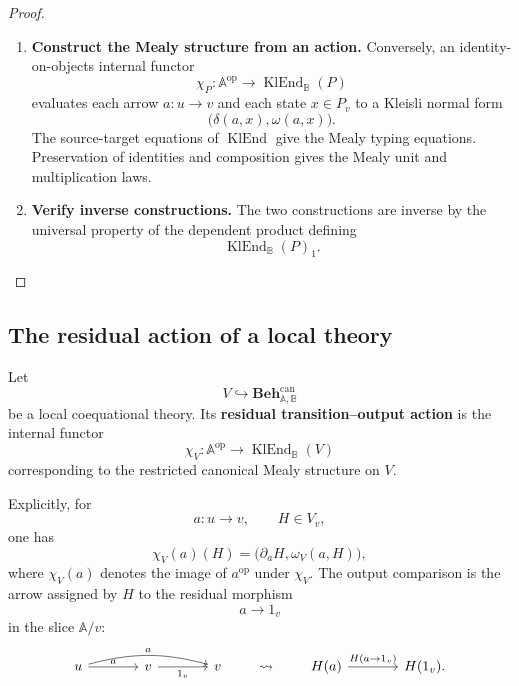 \begin{proof}
\begin{enumerate}
        \item \textbf{Construct the Mealy structure from an action.}
        Conversely, an identity-on-objects internal functor
        \[
            \chi_P:\mathbb A^{\mathrm{op}}
            \to
            \operatorname{KlEnd}_{\mathbb B}(P)
        \]
        evaluates each arrow \(a:u\to v\) and each state \(x\in P_v\) to a
        Kleisli normal form
        \[
            \bigl(\delta(a,x),\omega(a,x)\bigr).
        \]
        The source-target equations of \(\operatorname{KlEnd}\) give the
        Mealy typing equations. Preservation of identities and composition
        gives the Mealy unit and multiplication laws.

        \item \textbf{Verify inverse constructions.}
        The two constructions are inverse by the universal property of the
        dependent product defining
        \[
            \operatorname{KlEnd}_{\mathbb B}(P)_1.
        \]
    \end{enumerate}
\end{proof}

\subsection{The residual action of a local theory}
\label{subsec:to-residual-action-local-theory}

\begin{definition}
\label{def:to-residual-kleisli-action}
    Let
    \[
        V\hookrightarrow
        \mathbf{Beh}^{\mathrm{can}}_{\mathbb A,\mathbb B}
    \]
    be a local coequational theory. Its \textbf{residual transition--output
    action} is the internal functor
    \[
        \chi_V:
        \mathbb A^{\mathrm{op}}
        \to
        \operatorname{KlEnd}_{\mathbb B}(V)
    \]
    corresponding to the restricted canonical Mealy structure on \(V\).
\end{definition}

Explicitly, for
\[
    a:u\to v,
    \qquad
    H\in V_v,
\]
one has
\[
    \chi_V(a)(H)
    =
    \bigl(\partial_aH,\omega_V(a,H)\bigr),
\]
where \(\chi_V(a)\) denotes the image of \(a^{\mathrm{op}}\) under
\(\chi_V\). The output comparison is the arrow assigned by \(H\) to the
residual morphism
\[
    a\to 1_v
\]
in the slice \(\mathbb A/v\):
\[
\begin{tikzcd}[column sep=large, row sep=large]
    u
        \arrow[r, "a"]
        \arrow[rr, "a", bend left=15]
    &
    v
        \arrow[r, "1_v"']
    &
    v
\end{tikzcd}
\qquad
\leadsto
\qquad
\begin{tikzcd}[column sep=large, row sep=large]
    H(a)
        \arrow[r, "{H(a\to 1_v)}"]
    &
    H(1_v).
\end{tikzcd}
\]


